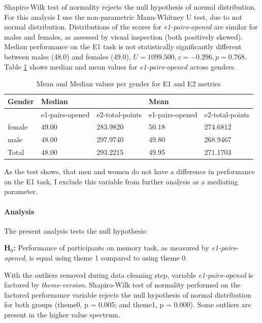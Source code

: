 		Shapiro-Wilk test of normality rejects the null hypothesis of normal distribution. For this analysis I use the non-parametric Mann-Whitney U test, due to not normal distribution. Distributions of the scores for \textit{e1-pairs-opened} are similar for males and females, as assessed by visual inspection (both positively skewed). Median performance on the E1 task is not statistically significantly different between males (48.0) and females (49.0), $ U = 1099.500, z = -0.296, p = 0.768 $. Table \ref{tbl:e1e2means} shows median and mean values for \textit{e1-pairs-opened} across genders.
		
		\begin{table}[]
			\centering
			\begin{tabular}{l|l|l|l|l}
				Gender & \multicolumn{2}{l}{Median} & \multicolumn{2}{l}{Mean}       \\ \hline
				& e1-pairs-opened & e2-total-points & e1-pairs-opened & e2-total-points		\\ \hline
				female & 49.00             & 283.9820 & 50.18             & 274.6812      \\
				male   & 48.00             & 297.9740 & 49.80             & 268.9467       \\ \hline
				Total  & 48.00             & 293.2215 & 49.95             & 271.1703      \\ \hline \hline
			\end{tabular}
			\caption{Mean and Median values per gender for E1 and E2 metrics}
			\label{tbl:e1e2means}
		\end{table}
	
		As the test shows, that men and women do not have a difference in performance on the E1 task, I exclude this variable from further analysis as a mediating parameter.
		
		\paragraph{Analysis} 
		
		The present analysis tests the null hypothesis:
		
		\textbf{H$_{0}$:} Performance of participants on memory task, as measured by \textit{e1-pairs-opened}, is equal using theme 1 compared to using theme 0.
		
		With the outliers removed during data cleaning step, variable \textit{e1-pairs-opened} is factored by \textit{theme-version}. Shapiro-Wilk test of normality performed on the factored performance variable rejects the null hypothesis of normal distribution for both groups (theme0, p = 0.005; and theme1, p = 0.000).
		Some outliers are present in the higher value spectrum.
		
